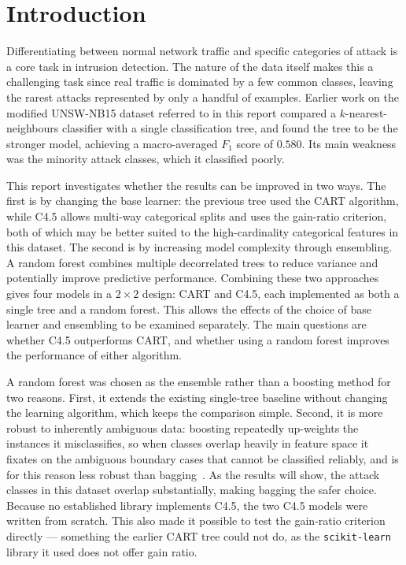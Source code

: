 \documentclass[conference]{IEEEtran}
\begin{document}
\section{Introduction} %

Differentiating between normal network traffic and specific categories of attack is a core task
in intrusion detection. The nature of the data itself makes this a challenging task since
real traffic is dominated
by a few common classes, leaving the rarest attacks represented by only a handful of examples.
Earlier work on the modified UNSW-NB15 dataset referred to in this report compared a $k$-nearest-neighbours
classifier with a single classification tree, and found the tree to be the stronger model, achieving
a macro-averaged $F_1$ score of $0.580$. Its main weakness was the minority attack classes, which it
classified poorly.

This report investigates whether the results can be improved in two ways. The first is by changing 
the base learner: the previous tree used the CART algorithm, while C4.5 allows multi-way categorical 
splits and uses the gain-ratio criterion, both of which may be better suited to the high-cardinality 
categorical features in this dataset. The second is by increasing model complexity through ensembling. 
A random forest combines multiple decorrelated trees to reduce variance and potentially improve 
predictive performance. Combining these two approaches gives four models in a $2\times2$ design: 
CART and C4.5, each implemented as both a single tree and a random forest. This allows the effects 
of the choice of base learner and ensembling to be examined separately. The main questions are 
whether C4.5 outperforms CART, and whether using a random forest improves the performance of 
either algorithm.

A random forest was chosen as the ensemble rather than a boosting method for two reasons. First, it
extends the existing single-tree baseline without changing the learning algorithm, which keeps the
comparison simple. Second, it is more robust to inherently ambiguous data: boosting repeatedly
up-weights the instances it misclassifies, so when classes overlap heavily in feature space it
fixates on the ambiguous boundary cases that cannot be classified reliably, and is for this reason
less robust than bagging~\cite{dietterich2000}. As the results will show, the attack classes in this
dataset overlap substantially, making bagging the safer choice. Because no established library implements C4.5, the
two C4.5 models were written from scratch. This also made it possible to test the gain-ratio
criterion directly --- something the earlier CART tree could not do, as the \texttt{scikit-learn}
library it used does not offer gain ratio.
\end{document}
